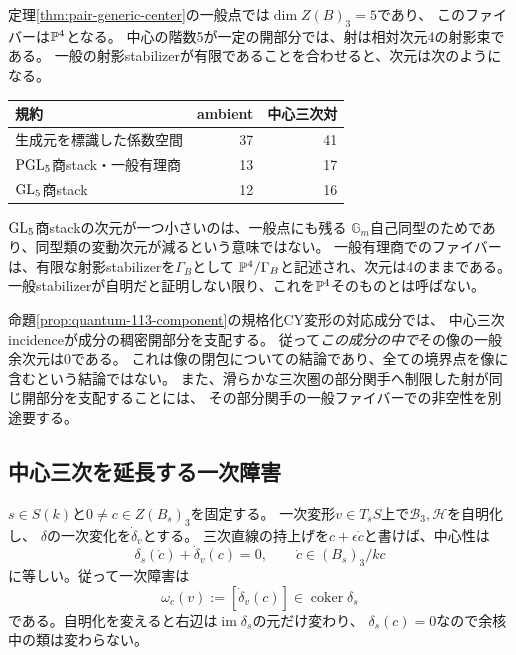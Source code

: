 定理\ref{thm:pair-generic-center}の一般点では$\dim Z(B)_3=5$であり、
このファイバーは$\mathbb P^4$となる。
中心の階数5が一定の開部分では、射は相対次元4の射影束である。
一般の射影stabilizerが有限であることを合わせると、次元は次のようになる。
\begin{center}
\begin{tabular}{lrr}
\toprule
規約&ambient&中心三次対\\
\midrule
生成元を標識した係数空間&37&41\\
$\mathrm{PGL}_5$商stack・一般有理商&13&17\\
$\mathrm{GL}_5$商stack&12&16\\
\bottomrule
\end{tabular}
\end{center}
$\mathrm{GL}_5$商stackの次元が一つ小さいのは、一般点にも残る
$\mathbb G_m$自己同型のためであり、同型類の変動次元が減るという意味ではない。
一般有理商でのファイバーは、有限な射影stabilizerを$\Gamma_B$として
$\mathbb P^4/\Gamma_B$と記述され、次元は4のままである。
一般stabilizerが自明だと証明しない限り、これを$\mathbb P^4$そのものとは呼ばない。

命題\ref{prop:quantum-113-component}の規格化CY変形の対応成分では、
中心三次incidenceが成分の稠密開部分を支配する。
従って\emph{この成分の中で}その像の一般余次元は0である。
これは像の閉包についての結論であり、全ての境界点を像に含むという結論ではない。
また、滑らかな三次圏の部分関手へ制限した射が同じ開部分を支配することには、
その部分関手の一般ファイバーでの非空性を別途要する。

\subsection{中心三次を延長する一次障害}
$s\in S(k)$と$0\ne c\in Z(B_s)_3$を固定する。
一次変形$v\in T_sS$上で$\mathcal B_3,\mathcal H$を自明化し、
$\delta$の一次変化を$\dot\delta_v$とする。
三次直線の持上げを$c+\epsilon\dot c$と書けば、中心性は
\begin{equation}\label{eq:central-tangent-equation}
 \delta_s(\dot c)+\dot\delta_v(c)=0,
 \qquad \dot c\in(B_s)_3/kc
\end{equation}
に等しい。従って一次障害は
\begin{equation}\label{eq:central-tangent-obstruction}
 \omega_c(v):=[\dot\delta_v(c)]\in\operatorname{coker}\delta_s
\end{equation}
である。自明化を変えると右辺は$\operatorname{im}\delta_s$の元だけ変わり、
$\delta_s(c)=0$なので余核中の類は変わらない。

